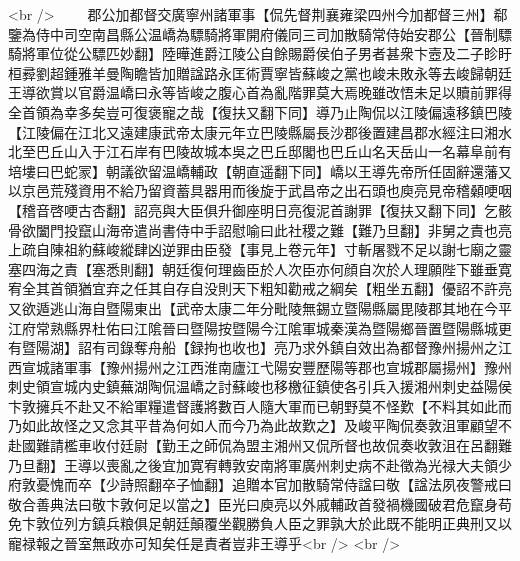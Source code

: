 <br />
　　郡公加都督交廣寧州諸軍事【侃先督荆襄雍梁四州今加都督三州】郗鑒為侍中司空南昌縣公温嶠為驃騎將軍開府儀同三司加散騎常侍始安郡公【晉制驃騎將軍位從公驃匹妙翻】陸曄進爵江陵公自餘賜爵侯伯子男者甚衆卞壼及二子眕盱桓彛劉超鍾雅羊曼陶瞻皆加贈諡路永匡術賈寧皆蘇峻之黨也峻未敗永等去峻歸朝廷王導欲賞以官爵温嶠曰永等皆峻之腹心首為亂階罪莫大焉晚雖改悟未足以贖前罪得全首領為幸多矣豈可復褒寵之哉【復扶又翻下同】導乃止陶侃以江陵偏遠移鎮巴陵【江陵偏在江北又遠建康武帝太康元年立巴陵縣屬長沙郡後置建昌郡水經注曰湘水北至巴丘山入于江石岸有巴陵故城本吳之巴丘邸閣也巴丘山名天岳山一名幕阜前有培塿曰巴蛇冡】朝議欲留温嶠輔政【朝直遥翻下同】嶠以王導先帝所任固辭還藩又以京邑荒殘資用不給乃留資蓄具器用而後旋于武昌帝之出石頭也庾亮見帝稽顙哽咽【稽音啓哽古杏翻】詔亮與大臣俱升御座明日亮復泥首謝罪【復扶又翻下同】乞骸骨欲闔門投竄山海帝遣尚書侍中手詔慰喻曰此社稷之難【難乃旦翻】非舅之責也亮上疏自陳祖約蘇峻縱肆凶逆罪由臣發【事見上卷元年】寸斬屠戮不足以謝七廟之靈塞四海之責【塞悉則翻】朝廷復何理齒臣於人次臣亦何顔自次於人理願陛下雖垂寛宥全其首領猶宜弃之任其自存自没則天下粗知勸戒之綱矣【粗坐五翻】優詔不許亮又欲遁逃山海自暨陽東出【武帝太康二年分毗陵無錫立暨陽縣屬毘陵郡其地在今平江府常熟縣界杜佑曰江隂晉曰暨陽按暨陽今江隂軍城秦漢為暨陽鄉晉置暨陽縣城更有暨陽湖】詔有司錄奪舟船【録拘也收也】亮乃求外鎮自效出為都督豫州揚州之江西宣城諸軍事【豫州揚州之江西淮南廬江弋陽安豐歷陽等郡也宣城郡屬揚州】豫州刺史領宣城内史鎮蕪湖陶侃温嶠之討蘇峻也移檄征鎮使各引兵入援湘州刺史益陽侯卞敦擁兵不赴又不給軍糧遣督護將數百人隨大軍而已朝野莫不怪歎【不料其如此而乃如此故怪之又念其平昔為何如人而今乃為此故歎之】及峻平陶侃奏敦沮軍顧望不赴國難請檻車收付廷尉【勤王之師侃為盟主湘州又侃所督也故侃奏收敦沮在呂翻難乃旦翻】王導以喪亂之後宜加寛宥轉敦安南將軍廣州刺史病不赴徵為光禄大夫領少府敦憂愧而卒【少詩照翻卒子恤翻】追贈本官加散騎常侍諡曰敬【諡法夙夜警戒曰敬合善典法曰敬卞敦何足以當之】臣光曰庾亮以外戚輔政首發禍機國破君危竄身苟免卞敦位列方鎮兵粮俱足朝廷顛覆坐觀勝負人臣之罪孰大於此既不能明正典刑又以寵禄報之晉室無政亦可知矣任是責者豈非王導乎<br />
<br />
